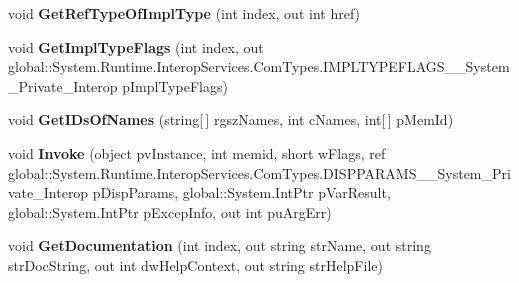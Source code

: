 \begin{DoxyCompactItemize}
void {\bfseries Get\+Ref\+Type\+Of\+Impl\+Type} (int index, out int href)
\item 
\mbox{\label{interface_system_1_1_runtime_1_1_interop_services_1_1_com_types_1_1_i_type_info_____system___private___interop_ae5c606ba7b1dd1ba41edfa764de5bf7f}} 
void {\bfseries Get\+Impl\+Type\+Flags} (int index, out global\+::\+System.\+Runtime.\+Interop\+Services.\+Com\+Types.\+I\+M\+P\+L\+T\+Y\+P\+E\+F\+L\+A\+G\+S\+\_\+\+\_\+\+System\+\_\+\+Private\+\_\+\+Interop p\+Impl\+Type\+Flags)
\item 
\mbox{\label{interface_system_1_1_runtime_1_1_interop_services_1_1_com_types_1_1_i_type_info_____system___private___interop_a6aa20dbdd253a9bb2b4072bf7d6ea031}} 
void {\bfseries Get\+I\+Ds\+Of\+Names} (string\mbox{[}$\,$\mbox{]} rgsz\+Names, int c\+Names, int\mbox{[}$\,$\mbox{]} p\+Mem\+Id)
\item 
\mbox{\label{interface_system_1_1_runtime_1_1_interop_services_1_1_com_types_1_1_i_type_info_____system___private___interop_a75ad94dc5c9adbb0a9b1de1c846b395e}} 
void {\bfseries Invoke} (object pv\+Instance, int memid, short w\+Flags, ref global\+::\+System.\+Runtime.\+Interop\+Services.\+Com\+Types.\+D\+I\+S\+P\+P\+A\+R\+A\+M\+S\+\_\+\+\_\+\+System\+\_\+\+Private\+\_\+\+Interop p\+Disp\+Params, global\+::\+System.\+Int\+Ptr p\+Var\+Result, global\+::\+System.\+Int\+Ptr p\+Excep\+Info, out int pu\+Arg\+Err)
\item 
\mbox{\label{interface_system_1_1_runtime_1_1_interop_services_1_1_com_types_1_1_i_type_info_____system___private___interop_a3c7cc84cf38e70c6a8f2599ea99597fb}} 
void {\bfseries Get\+Documentation} (int index, out string str\+Name, out string str\+Doc\+String, out int dw\+Help\+Context, out string str\+Help\+File)
\item 
\mbox{\label{interface_system_1_1_runtime_1_1_interop_services_1_1_com_types_1_1_i_type_info_____system___private___interop_a943dffd3908114326ac1e08d036b2aa7}} 

\end{DoxyCompactItemize}
